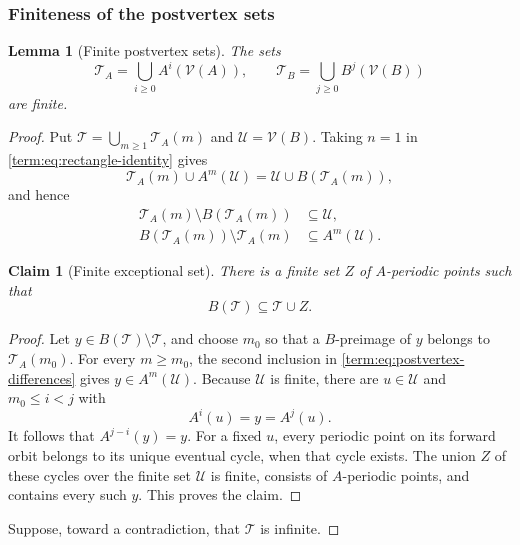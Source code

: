 \documentclass[11pt]{article}
\newtheorem{lemma}[theorem]{Lemma}
\newtheorem{claim}[theorem]{Claim}
\theoremstyle{definition}
\theoremstyle{remark}
\begin{document}
\subsubsection{Finiteness of the postvertex sets}

\begin{lemma}[Finite postvertex sets]
\label{lem:finite-postvertex}
The sets
\[
 \mathcal T_A=\bigcup_{i\geq0}A^i(\mathcal V(A)),\qquad
 \mathcal T_B=\bigcup_{j\geq0}B^j(\mathcal V(B))
\]
are finite.
\end{lemma}

\begin{proof}
Put
$\mathcal T=\bigcup_{m\geq1}\mathcal T_A(m)$ and
$\mathcal U=\mathcal V(B)$.  Taking $n=1$ in
\eqref{term:eq:rectangle-identity} gives
\[
 \mathcal T_A(m)\cup A^m(\mathcal U)
 =\mathcal U\cup B(\mathcal T_A(m)),
\]
and hence
\begin{equation}\label{term:eq:postvertex-differences}
\begin{aligned}
 \mathcal T_A(m)\setminus B(\mathcal T_A(m))&\subseteq\mathcal U,\\
 B(\mathcal T_A(m))\setminus\mathcal T_A(m)&\subseteq A^m(\mathcal U).
\end{aligned}
\end{equation}
\begin{claim}[Finite exceptional set]\label{clm:pl-postvertex-exceptional}
There is a finite set \(Z\) of \(A\)-periodic points such that
\begin{equation}\label{term:eq:B-T}
 B(\mathcal T)\subseteq\mathcal T\cup Z.
\end{equation}
\end{claim}

\begin{proof}
Let \(y\in B(\mathcal T)\setminus\mathcal T\), and choose \(m_0\) so that a
\(B\)-preimage of \(y\) belongs to \(\mathcal T_A(m_0)\).  For every
\(m\geq m_0\), the second inclusion in
\eqref{term:eq:postvertex-differences} gives \(y\in A^m(\mathcal U)\).
Because \(\mathcal U\) is finite, there are \(u\in\mathcal U\) and
\(m_0\leq i<j\) with
\[
 A^i(u)=y=A^j(u).
\]
It follows that \(A^{j-i}(y)=y\).  For a fixed \(u\), every periodic point
on its forward orbit belongs to its unique eventual cycle, when that cycle
exists.  The union \(Z\) of these cycles over the finite set \(\mathcal U\)
is finite, consists of \(A\)-periodic points, and contains every such \(y\).
This proves the claim.
\end{proof}

Suppose, toward a contradiction, that \(\mathcal T\) is infinite.


\end{proof}
\end{document}
